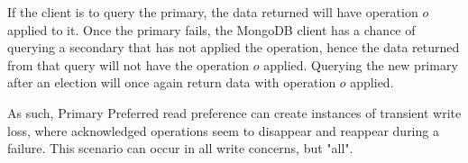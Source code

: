 If the client is to query the primary, the data returned will have operation $o$ applied to it. Once the primary fails, the MongoDB client has a chance of querying a secondary that has not applied the operation, hence the data returned from that query will not have the operation $o$ applied. Querying the new primary after an election will once again return data with operation $o$ applied. 

As such, Primary Preferred read preference can create instances of transient write loss, where acknowledged operations seem to disappear and reappear during a failure. This scenario can occur in all write concerns, but "all".